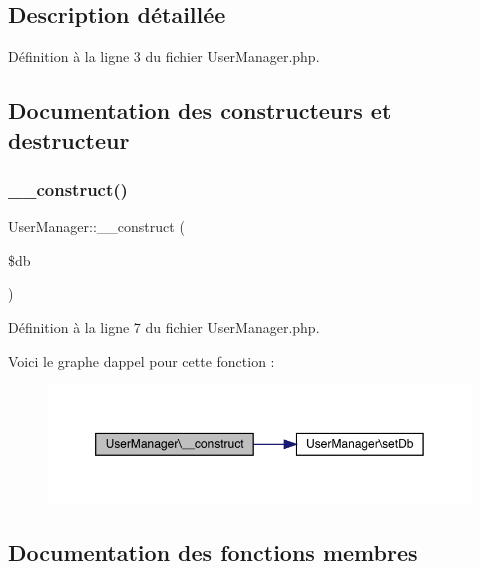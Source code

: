 \subsection{Description détaillée}


Définition à la ligne 3 du fichier User\+Manager.\+php.



\subsection{Documentation des constructeurs et destructeur}
\mbox{\label{class_user_manager_aa48eb712a3ee85eaa253e55e130efb52}} 
\subsubsection{\texorpdfstring{\+\_\+\+\_\+construct()}{\_\_construct()}}
{\footnotesize\ttfamily User\+Manager\+::\+\_\+\+\_\+construct (\begin{DoxyParamCaption}\item[{}]{\$db }\end{DoxyParamCaption})}



Définition à la ligne 7 du fichier User\+Manager.\+php.

Voici le graphe d\textquotesingle{}appel pour cette fonction \+:\nopagebreak
\begin{figure}[H]
\begin{center}
\leavevmode
\includegraphics[width=350pt]{class_user_manager_aa48eb712a3ee85eaa253e55e130efb52_cgraph}
\end{center}
\end{figure}


\subsection{Documentation des fonctions membres}
\mbox{\label{class_user_manager_a7fb17bfd67135d7be043d59aeec1dcd4}} 
